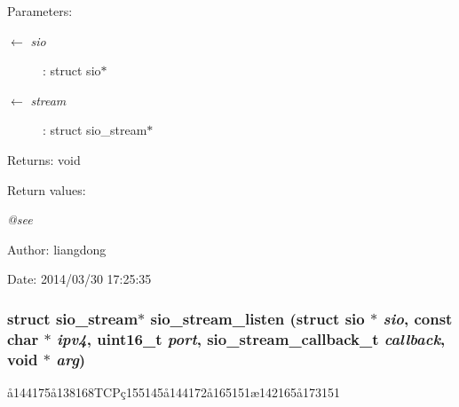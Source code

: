 \begin{Desc}
\item[Parameters:]
\begin{description}
\item[\mbox{$\leftarrow$} {\em sio}]: struct sio$\ast$ \item[\mbox{$\leftarrow$} {\em stream}]: struct sio\_\-stream$\ast$ \end{description}
\end{Desc}
\begin{Desc}
\item[Returns:]void \end{Desc}
\begin{Desc}
\item[Return values:]
\begin{description}
\item[{\em @see}]\end{description}
\end{Desc}
\begin{Desc}
\item[Author:]liangdong \end{Desc}
\begin{Desc}
\item[Date:]2014/03/30 17:25:35 \end{Desc}
\subsubsection{\setlength{\rightskip}{0pt plus 5cm}struct sio\_\-stream$\ast$ sio\_\-stream\_\-listen (struct sio $\ast$ {\em sio}, const char $\ast$ {\em ipv4}, uint16\_\-t {\em port}, sio\_\-stream\_\-callback\_\-t {\em callback}, void $\ast$ {\em arg})}\label{sio__stream_8h_a8}


\aa{}144175\aa{}138168TCP\c{c}155145\aa{}144172\aa{}165151\ae{}142165\aa{}173151 

